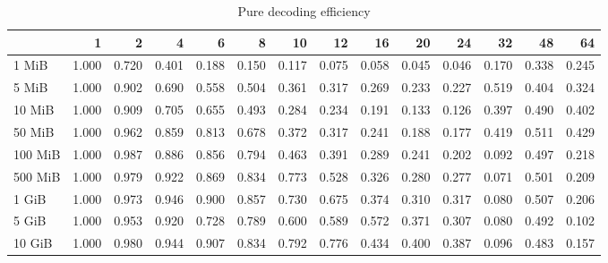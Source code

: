 \begin{centering}
\begin{table}[!h]
	\caption{Pure decoding efficiency}
	\begin{tabular}{lrrrrrrrrrrrrr}
		\toprule
		\diagbox[width=7em]{Size}{Threads} &    1  &    2  &    4  &    6  &    8  &    10 &    12 &    16 &    20 &    24 &    32 &    48 &    64 \\
		\midrule
		1 MiB   & 1.000 & 0.720 & 0.401 & 0.188 & 0.150 & 0.117 & 0.075 & 0.058 & 0.045 & 0.046 & 0.170 & 0.338 & 0.245 \\
		5 MiB   & 1.000 & 0.902 & 0.690 & 0.558 & 0.504 & 0.361 & 0.317 & 0.269 & 0.233 & 0.227 & 0.519 & 0.404 & 0.324 \\
		10 MiB  & 1.000 & 0.909 & 0.705 & 0.655 & 0.493 & 0.284 & 0.234 & 0.191 & 0.133 & 0.126 & 0.397 & 0.490 & 0.402 \\
		50 MiB  & 1.000 & 0.962 & 0.859 & 0.813 & 0.678 & 0.372 & 0.317 & 0.241 & 0.188 & 0.177 & 0.419 & 0.511 & 0.429 \\
		100 MiB & 1.000 & 0.987 & 0.886 & 0.856 & 0.794 & 0.463 & 0.391 & 0.289 & 0.241 & 0.202 & 0.092 & 0.497 & 0.218 \\
		500 MiB & 1.000 & 0.979 & 0.922 & 0.869 & 0.834 & 0.773 & 0.528 & 0.326 & 0.280 & 0.277 & 0.071 & 0.501 & 0.209 \\
		1 GiB   & 1.000 & 0.973 & 0.946 & 0.900 & 0.857 & 0.730 & 0.675 & 0.374 & 0.310 & 0.317 & 0.080 & 0.507 & 0.206 \\
		5 GiB   & 1.000 & 0.953 & 0.920 & 0.728 & 0.789 & 0.600 & 0.589 & 0.572 & 0.371 & 0.307 & 0.080 & 0.492 & 0.102 \\
		10 GiB  & 1.000 & 0.980 & 0.944 & 0.907 & 0.834 & 0.792 & 0.776 & 0.434 & 0.400 & 0.387 & 0.096 & 0.483 & 0.157 \\
		\bottomrule
	\end{tabular}
\end{table}
\end{centering}
